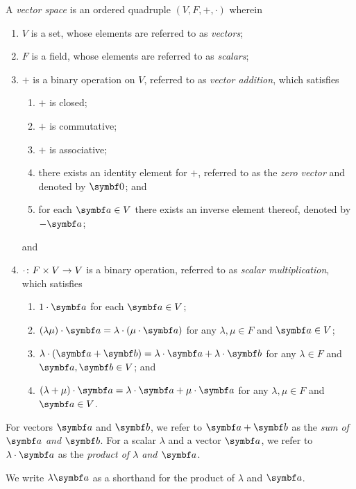 \Bdf
  A \emph{vector space} is an ordered quadruple \((V, F, +, \cdot)\) wherein
  \begin{enumerate}
    \item \(V\) is a set, whose elements are referred to as \emph{vectors};
    \item \(F\) is a field, whose elements are referred to as \emph{scalars};
    \item \(+\) is a binary operation on \(V\), referred to as \emph{vector addition}, which satisfies
    \begin{enumerate}
      \item \(+\) is closed;
      \item \(+\) is commutative;
      \item \(+\) is associative;
      \item there exists an identity element for \(+\), referred to as the \emph{zero vector} and denoted by
      \(\vct{0}\); and
      \item for each \(\vct{a} \in V\) there exists an inverse element thereof, denoted by \(-\vct{a}\);
    \end{enumerate}
    and
    \item \(\cdot\colon F \times V\to V\) is a binary operation, referred to as \emph{scalar multiplication}, which
    satisfies
    \begin{enumerate}
      \item \(1 \cdot \vct{a}\) for each \(\vct{a} \in V\);
      \item \((\lambda \mu) \cdot \vct{a} = \lambda \cdot (\mu \cdot \vct{a})\) for any \(\lambda, \mu \in F\) and
      \(\vct{a} \in V\);
      \item \(\lambda \cdot (\vct{a} + \vct{b}) = \lambda \cdot \vct{a} + \lambda \cdot \vct{b}\) for any
      \(\lambda \in F\) and \(\vct{a}, \vct{b} \in V\); and
      \item \((\lambda + \mu) \cdot \vct{a} = \lambda \cdot \vct{a} + \mu \cdot \vct{a}\) for any \(\lambda, \mu \in F\)
      and \(\vct{a} \in V\).
    \end{enumerate}
  \end{enumerate}

  For vectors \(\vct{a}\) and \(\vct{b}\), we refer to \(\vct{a} + \vct{b}\) as the \emph{sum of \(\vct{a}\) and
  \(\vct{b}\)}. For a scalar \(\lambda\) and a vector \(\vct{a}\), we refer to \(\lambda \cdot \vct{a}\) as the
  \emph{product of \(\lambda\) and \(\vct{a}\)}.
\Edf

We write \(\lambda \vct{a}\) as a shorthand for the product of \(\lambda\) and \(\vct{a}\).


